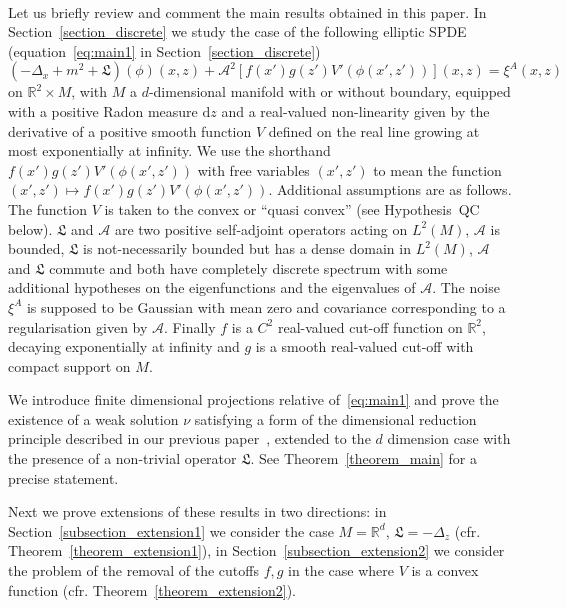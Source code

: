 \documentclass[a4paper,10pt]{article}
\newcommand{\mathd}{\mathrm{d}}
\begin{document}
\

Let us briefly review and comment the main results obtained in this paper. In
Section~\ref{section_discrete} we study the case of the following elliptic
SPDE (equation~{\eqref{eq:main1}} in Section~\ref{section_discrete})
\[ (- \Delta_x + m^2 + \mathfrak{L}) (\phi) (x, z) + \mathcal{A}^2 [f (x') g
   (z') V' (\phi (x', z'))] (x, z) = \xi^A (x, z) \]
on $\mathbb{R}^2 \times M$, with $M$ a $d$-dimensional manifold with or
without boundary, equipped with a positive Radon measure $\mathd z$ and a
real-valued non-linearity given by the derivative of a positive smooth
function $V$ defined on the real line growing at most exponentially at
infinity. We use the shorthand $f (x') g (z') V' (\phi (x', z'))$ with free
variables $(x', z')$ to mean the function $(x', z') \mapsto f (x') g (z') V'
(\phi (x', z'))$. Additional assumptions are as follows. The function $V$ is
taken to the convex or ``quasi convex'' (see Hypothesis~QC below).
$\mathfrak{L}$ and $\mathcal{A}$ are two positive self-adjoint operators
acting on $L^2 (M)$, $\mathcal{A}$ is bounded, $\mathfrak{L}$ is
not-necessarily bounded but has a dense domain in $L^2 (M)$, $\mathcal{A}$ and
$\mathfrak{L}$ commute and both have completely discrete spectrum with some
additional hypotheses on the eigenfunctions and the eigenvalues of
$\mathcal{A}$. The noise $\xi^A$ is supposed to be Gaussian with mean zero and
covariance corresponding to a regularisation given by $\mathcal{A}$. Finally
$f$ is a $C^2$ real-valued cut-off function on $\mathbb{R}^2$, decaying
exponentially at infinity and $g$ is a smooth real-valued cut-off with compact
support on $M$.

We introduce finite dimensional projections relative of~{\eqref{eq:main1}}
and prove the existence of a weak solution $\nu$ satisfying a form of the
dimensional reduction principle described in our previous
paper~{\cite{Albeverio2018elliptic}}, extended to the $d$ dimension case with
the presence of a non-trivial operator $\mathfrak{L}$. See
Theorem~\ref{theorem_main} for a precise statement.

Next we prove extensions of these results in two directions: in
Section~\ref{subsection_extension1} we consider the case $M =\mathbb{R}^d$,
$\mathfrak{L} = - \Delta_z$ (cfr. Theorem~\ref{theorem_extension1}), in
Section~\ref{subsection_extension2} we consider the problem of the removal of
the cutoffs $f, g$ in the case where $V$ is a convex function (cfr.
Theorem~\ref{theorem_extension2}).

\
\end{document}
